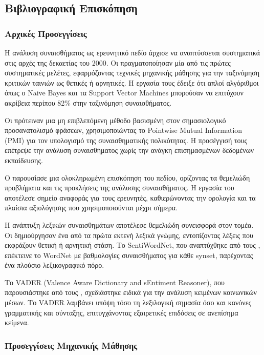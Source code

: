 \documentclass[a4paper,11pt,oneside,openany]{ioniothesis}
\begin{document}
\subsection{Βιβλιογραφική Επισκόπηση}
\label{sec:Βιβλιογραφική Επισκόπηση}

\subsubsection{Αρχικές Προσεγγίσεις}
\label{sec:Αρχικές Προσεγγίσεις}

Η ανάλυση συναισθήματος ως ερευνητικό πεδίο άρχισε να αναπτύσσεται συστηματικά στις αρχές της δεκαετίας του 2000. Οι \cite{pang2002thumbs} πραγματοποίησαν μία από τις πρώτες συστηματικές μελέτες, εφαρμόζοντας τεχνικές μηχανικής μάθησης για την ταξινόμηση κριτικών ταινιών ως θετικές ή αρνητικές. Η εργασία τους έδειξε ότι απλοί αλγόριθμοι όπως ο Naive Bayes και τα Support Vector Machines μπορούσαν να επιτύχουν ακρίβεια περίπου 82\% στην ταξινόμηση συναισθήματος.

Οι \cite{turney2002thumbs} πρότειναν μια μη επιβλεπόμενη μέθοδο βασισμένη στον σημασιολογικό προσανατολισμό φράσεων, χρησιμοποιώντας το Pointwise Mutual Information (PMI) για τον υπολογισμό της συναισθηματικής πολικότητας. Η προσέγγισή τους επέτρεψε την ανάλυση συναισθήματος χωρίς την ανάγκη επισημασμένων δεδομένων εκπαίδευσης.

Ο \cite{liu2012sentiment} παρουσίασε μια ολοκληρωμένη επισκόπηση του πεδίου, ορίζοντας τα θεμελιώδη προβλήματα και τις προκλήσεις της ανάλυσης συναισθήματος. Η εργασία του αποτέλεσε σημείο αναφοράς για τους ερευνητές, καθιερώνοντας την ορολογία και τα πλαίσια αξιολόγησης που χρησιμοποιούνται μέχρι σήμερα.

Η ανάπτυξη λεξικών συναισθημάτων αποτέλεσε θεμελιώδη συνεισφορά στον τομέα. Οι \cite{hu2004mining} δημιούργησαν ένα από τα πρώτα εκτενή λεξικά γνώμης, εντοπίζοντας λέξεις που εκφράζουν θετική ή αρνητική στάση. Το SentiWordNet, που αναπτύχθηκε από τους \cite{baccianella2010sentiwordnet}, επέκτεινε το WordNet με βαθμολογίες συναισθήματος για κάθε synset, παρέχοντας ένα πλούσιο λεξικογραφικό πόρο.

Το VADER (Valence Aware Dictionary and sEntiment Reasoner), που παρουσιάστηκε από τους \cite{hutto2014vader}, σχεδιάστηκε ειδικά για την ανάλυση κειμένων κοινωνικών μέσων. Το VADER λαμβάνει υπόψη τόσο τη λεξιλογική σημασία όσο και κανόνες γραμματικής και σύνταξης, επιτυγχάνοντας εξαιρετικές επιδόσεις σε ανεπίσημα κείμενα.

\subsubsection{Προσεγγίσεις Μηχανικής Μάθησης}
\label{sec:Προσεγγίσεις Μηχανικής Μάθησης}
\end{document}

